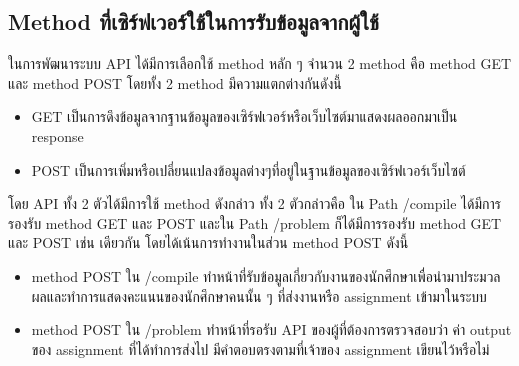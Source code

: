 \subsection{Method ที่เซิร์ฟเวอร์ใช้ในการรับข้อมูลจากผู้ใช้}
ในการพัฒนาระบบ API ได้มีการเลือกใช้ method หลัก ๆ จํานวน 2 method คือ
method GET และ method POST โดยทั้ง 2 method มีความแตกต่างกันดังนี้
\begin{itemize}
    \item GET เป็นการดึงข้อมูลจากฐานข้อมูลของเซิร์ฟเวอร์หรือเว็บไซต์มาแสดงผลออกมาเป็น response
    \item POST เป็นการเพิ่มหรือเปลี่ยนแปลงข้อมูลต่างๆที่อยู่ในฐานข้อมูลของเซิร์ฟเวอร์เว็บไซต์
\end{itemize}
โดย API ทั้ง 2 ตัวได้มีการใช้ method ดังกล่าว ทั้ง 2 ตัวกล่าวคือ ใน Path /compile ได้มีการรองรับ
method GET และ POST และใน Path /problem ก็ได้มีการรองรับ method GET และ POST เช่น
เดียวกัน โดยได้เน้นการทํางานในส่วน method POST ดังนี้
\begin{itemize}
    \item method POST ใน /compile ทําหน้าที่รับข้อมูลเกี่ยวกับงานของนักศึกษาเพื่อนํามาประมวล
ผลและทําการแสดงคะแนนของนักศึกษาคนนั้น ๆ ที่ส่งงานหรือ assignment เข้ามาในระบบ
    \item method POST ใน /problem ทําหน้าที่รอรับ API ของผู้ที่ต้องการตรวจสอบว่า ค่า output
ของ assignment ที่ได้ทําการส่งไป มีคําตอบตรงตามที่เจ้าของ assignment เขียนไว้หรือไม่
\end{itemize}
